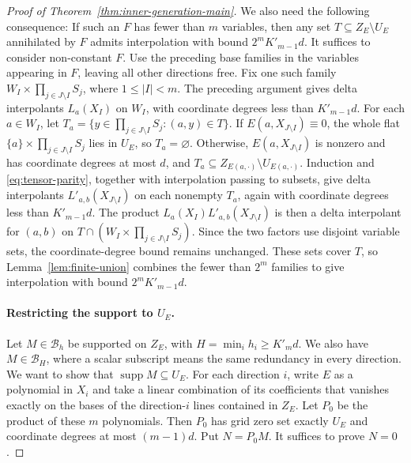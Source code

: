 \documentclass[10pt,a4paper]{amsart}
\newcommand{\supp}{\operatorname{supp}}
\theoremstyle{plain}
\theoremstyle{definition}
\theoremstyle{remark}
\begin{document}
\begin{proof}[Proof of Theorem~\ref{thm:inner-generation-main}]
We also need the following consequence: If such an $F$ has fewer than
$m$ variables, then any set
$T\subseteq Z_E\setminus U_E$ annihilated by $F$ admits interpolation
with bound $2^mK'_{m-1}d$.
It suffices to consider non-constant $F$. Use the
preceding base families in the variables appearing in $F$,
leaving all other directions free. Fix one such family
$W_I\times \prod_{j\in J \setminus I} S_j$, where $1\le|I|<m$. The preceding argument gives delta
interpolants $L_a(X_I)$ on $W_I$, with coordinate degrees
less than $K'_{m-1}d$.
For each $a\in W_I$, let
$T_a=\{y\in \prod_{j \in J\setminus I} S_j :(a,y)\in T\}$.
If $E(a,X_{J\setminus I})\equiv0$, the whole flat $\{a\}\times \prod_{j \in J\setminus I}S_{j}$
lies in $U_E$, so $T_a=\varnothing$. Otherwise, $E(a,X_{J\setminus I})$ is nonzero and has
coordinate degrees at most $d$, and $T_a\subseteq Z_{E(a,\cdot)}\setminus U_{E(a,\cdot)}.$
Induction and \eqref{eq:tensor-parity}, together with
interpolation passing to subsets, give delta interpolants
$L'_{a,b}(X_{J\setminus I})$ on each nonempty $T_a$, again with coordinate
degrees less than $K'_{m-1}d$.
The product $L_a(X_I)L'_{a,b}(X_{J\setminus I})$ is then a delta interpolant
for $(a,b)$ on $T\cap(W_I\times \prod_{j \in J\setminus I} S_j)$. Since the two factors
use disjoint variable sets, the coordinate-degree bound
remains unchanged. These sets cover $T$, so
Lemma~\ref{lem:finite-union} combines the fewer than $2^m$
families to give interpolation with bound $2^mK'_{m-1}d$.

\paragraph{Restricting the support to $U_E$.}
Let $M\in\mathcal{B}_h$ be supported on $Z_E$, with $H=\min_i h_i\ge K'_m d$. We also have $M\in\mathcal B_H$, where a scalar subscript means the same redundancy in every direction. We want to show that $\supp M\subseteq U_E$.
For each direction $i$, write $E$ as a polynomial in $X_i$ and take a
linear combination of its coefficients that vanishes exactly on the bases of
the direction-$i$ lines contained in $Z_E$. Let $P_0$ be the product of these $m$ polynomials. Then $P_0$ has grid zero set exactly $U_E$ and coordinate degrees at most $(m-1)d$. Put $N=P_0M$. It suffices to prove $N=0$.


\end{proof}
\end{document}
